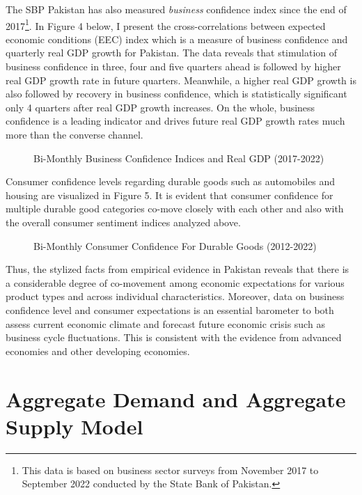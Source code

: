 \documentclass[12pt]{article}
\newcommand{\1}{\mathbbm 1}
\begin{document}
The SBP Pakistan has also measured \textit{business} confidence index since the end of 2017\footnote{This data is based on business sector surveys from November 2017 to September 2022 conducted by the State Bank of Pakistan.}. In Figure 4 below, I present the cross-correlations between expected economic conditions (EEC) index which is a measure of business confidence and quarterly real GDP growth for Pakistan. The data reveals that stimulation of business confidence in three, four and five quarters ahead is followed by higher real GDP growth rate in future quarters. Meanwhile, a higher real GDP growth is also followed by recovery in business confidence, which is statistically significant only 4 quarters after real GDP growth increases. On the whole, business confidence is a leading indicator and drives future real GDP growth rates much more than the converse channel.



\begin{figure}[H]
	\centering
	\scalebox{0.8}{}
	\caption[]{Bi-Monthly Business Confidence Indices and Real GDP (2017-2022)}
\end{figure}


Consumer confidence levels regarding durable goods such as automobiles and housing are visualized in Figure 5. It is evident that consumer confidence for multiple durable good categories co-move closely with each other and also with the overall consumer sentiment indices analyzed above.

	\begin{figure}[H]
	\centering
	\scalebox{0.8}{}
	\caption[]{Bi-Monthly Consumer Confidence For Durable Goods (2012-2022)}
\end{figure}


Thus, the stylized facts from empirical evidence in Pakistan reveals that there is a considerable degree of co-movement among economic expectations for various product types and across individual characteristics. Moreover, data on business confidence level and consumer expectations is an essential barometer to both assess current economic climate and forecast future economic crisis such as business cycle fluctuations. This is consistent with the evidence from advanced economies and other developing economies. 


		
		
		\section{Aggregate Demand and Aggregate Supply Model}
		
\end{document}
